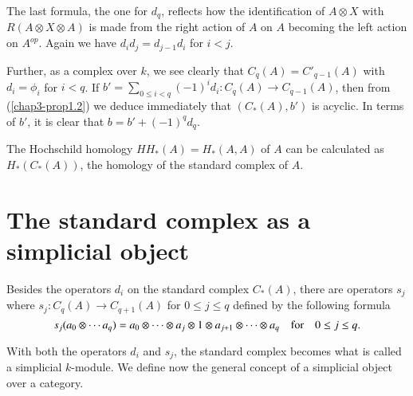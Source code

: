 The last formula, the one for $d_{q}$, reflects how the identification
of $A\otimes X$ with $R(A\otimes X\otimes A)$ is made from the right
action of $A$ on $A$ becoming the left action on $A^{op}$. Again we
have $d_{i}d_{j}=d_{j-1}d_{i}$ for $i<j$.

Further, as a complex over $k$, we see clearly that
$C_{q}(A)=C'_{q-1}(A)$ with $d_{i}=\phi_{i}$ for $i<q$. If
$b'=\sum\limits_{0\leq i<q}(-1)^{i}d_{i}:C_{q}(A)\to C_{q-1}(A)$, then
from (\ref{chap3-prop1.2}) we deduce immediately that
$(C_{\ast}(A),b')$ is acyclic. In terms of $b'$, it is clear that
$b=b'+(-1)^{q}d_{q}$. 

\begin{remark}\label{chap3-rem1.4}
The Hochschild homology $HH_{\ast}(A)=H_{\ast}(A,A)$ of $A$ can be
calculated as $H_{\ast}(C_{\ast}(A))$, the homology of the standard
complex of $A$.
\end{remark}

\section{The standard complex as a simplicial
  object}\label{chap3-sec2}

\begin{remark}\label{chap3-rem2.1}
Besides the operators $d_{i}$ on the standard complex $C_{\ast}(A)$,
there are operators $s_{j}$ where $s_{j}:C_{q}(A)\to C_{q+1}(A)$ for
$0\leq j\leq q$ defined by the following formula
$$
s_{j}(a_{0}\otimes \cdots a_{q})=a_{0}\otimes \cdots\otimes
a_{j}\otimes 1\otimes a_{j+1}\otimes\cdots\otimes a_{q}\quad\text{for}\quad
0\leq j\leq q.
$$

With both the operators $d_{i}$ and $s_{j}$, the standard complex
becomes what is called a simplicial $k$-module. We define now the
general concept of a simplicial object over a category.
\end{remark}


